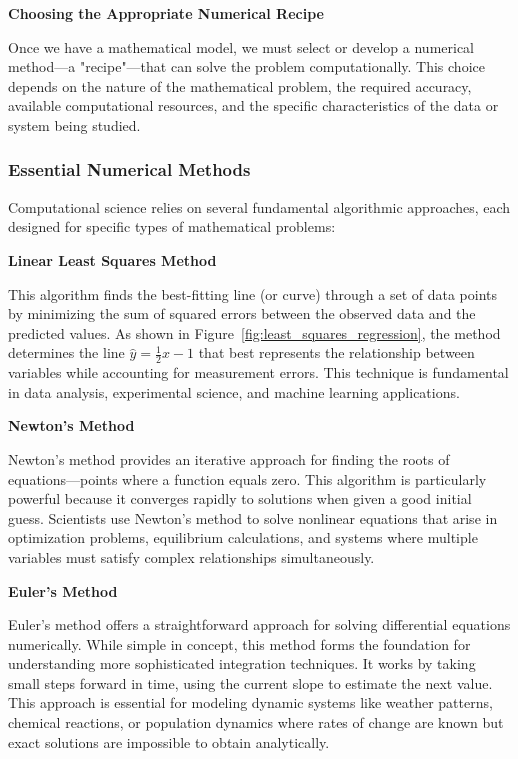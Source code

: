 \textbf{Choosing the Appropriate Numerical Recipe}

Once we have a mathematical model, we must select or develop a numerical method—a "recipe"—that can solve the problem computationally. This choice depends on the nature of the mathematical problem, the required accuracy, available computational resources, and the specific characteristics of the data or system being studied.

\subsubsection{Essential Numerical Methods}

Computational science relies on several fundamental algorithmic approaches, each designed for specific types of mathematical problems:

\textbf{Linear Least Squares Method}

This algorithm finds the best-fitting line (or curve) through a set of data points by minimizing the sum of squared errors between the observed data and the predicted values. As shown in Figure~\ref{fig:least_squares_regression}, the method determines the line $\hat{y} = \frac{1}{2}x - 1$ that best represents the relationship between variables while accounting for measurement errors. This technique is fundamental in data analysis, experimental science, and machine learning applications.

\textbf{Newton's Method}

Newton's method provides an iterative approach for finding the roots of equations—points where a function equals zero. This algorithm is particularly powerful because it converges rapidly to solutions when given a good initial guess. Scientists use Newton's method to solve nonlinear equations that arise in optimization problems, equilibrium calculations, and systems where multiple variables must satisfy complex relationships simultaneously.

\textbf{Euler's Method}

Euler's method offers a straightforward approach for solving differential equations numerically. While simple in concept, this method forms the foundation for understanding more sophisticated integration techniques. It works by taking small steps forward in time, using the current slope to estimate the next value. This approach is essential for modeling dynamic systems like weather patterns, chemical reactions, or population dynamics where rates of change are known but exact solutions are impossible to obtain analytically.

